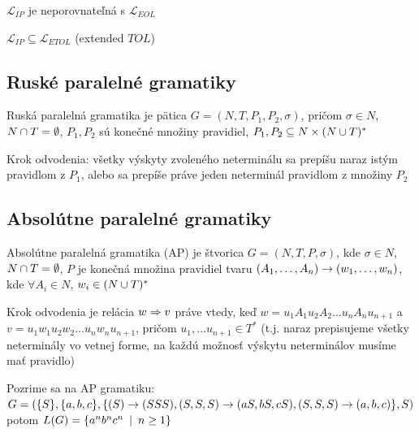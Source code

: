 \begin{veta}
    $\mathcal{L}_{IP}$ je neporovnateľná s $\mathcal{L}_{EOL}$
\end{veta}

\begin{veta}
    $\mathcal{L}_{IP}\subseteq\mathcal{L}_{ETOL}$ (extended $TOL$)
\end{veta}

\subsection{Ruské paralelné gramatiky}

\begin{definicia}
    Ruská paralelná gramatika je pätica $G=(N,T,P_{1},P_{2},\sigma)$,
    pričom $\sigma\in N$, \mbox{$N\cap T=\emptyset$}, $P_{1}, P_{2}$
    sú konečné množiny pravidiel, $P_{1},P_{2}\subseteq N\times(N\cup
    T)^{*}$
\end{definicia}

\begin{definicia}
    Krok odvodenia: všetky výskyty zvoleného neterminálu sa prepíšu
    naraz istým pravidlom z $P_{1}$, alebo sa prepíše práve jeden
    neterminál pravidlom z množiny $P_{2}$
\end{definicia}

\subsection{Absolútne paralelné gramatiky}

\begin{definicia}
    Absolútne paralelná gramatika (AP) je štvorica $G=(N,T,P,\sigma)$,
    kde \mbox{$\sigma\in N$}, $N\cap T=\emptyset$, $P$ je konečná
    množina pravidiel tvaru
    $(A_{1},\dots,A_{n})\rightarrow(w_{1},\dots,w_{n})$, kde \mbox{$\forall
    A_{i}\in N$}, $w_{i}\in(N\cup T)^{*}$
\end{definicia}

\begin{definicia}
    Krok odvodenia je relácia $w\Rightarrow v$ práve vtedy, keď
    $w=u_{1}A_{1}u_{2}A_{2}\dots u_{n}A_{n}u_{n+1}$ \mbox{a
    $v=u_{1}w_{1}u_{2}w_{2}\dots u_{n}w_{n}u_{n+1}$}, pričom
    $u_{1},\dots u_{n+1}\in T^{*}$ (t.j. naraz prepisujeme všetky
    neterminály vo vetnej forme, na každú možnosť výskytu neterminálov
    musíme mať pravidlo)
\end{definicia}

\begin{priklad}
    Pozrime sa na AP gramatiku:\\
    $G=(\{S\},\{a,b,c\},\{(S)\rightarrow(SSS),(S,S,S)\rightarrow (aS,bS,cS),(S,S,S)\rightarrow
    (a,b,c)\},S)$ potom $L(G)=\{a^{n}b^{n}c^{n}\enspace |\enspace n\geq1\}$
\end{priklad}

